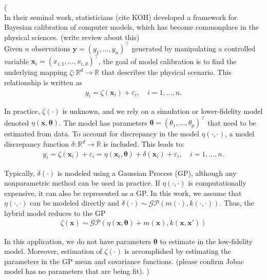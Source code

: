 \documentclass[journal=jacsat,manuscript=article]{achemso}
\newcommand{\kjnote}[1]{{\color{blue} (#1)}}
\newcommand{\kjtodo}[1]{{\color{red} (#1)}}
\newcommand{\alltodo}[1]{{\color{cyan} (#1)}}
\newcommand{\xvec}{\ensuremath{\mathbf{x}}}
\begin{document}
\kjnote{\\
In their seminal work, statisticians \kjtodo{cite KOH} developed a framework for Bayesian calibration of computer models, which has become commonplace in the physical sciences. \kjtodo{write review about this}\\

Given $n$ observations $\mathbf{y}=(y_1,\dots,y_n)^\intercal$ generated by manipulating a controlled variable $\xvec_i = (x_{i,1},\dots,x_{i,d})^\intercal$, the goal of model calibration is to find the underlying mapping $\zeta: \mathbb{R}^d \rightarrow \mathbb{R}$ that describes the physical scenario. This relationship is written as
\begin{gather}
    y_i = \zeta(\mathbf{x}_i) + \varepsilon_i, \quad i = 1,\dots,n. \label{eq: trueprocess}
\end{gather}

In practice, $\zeta(\cdot)$ is unknown, and we rely on a simulation or lower-fidelity model denoted $\eta(\mathbf{x}, \boldsymbol{\theta})$. The model has parameters $\boldsymbol{\theta}=(\theta_1,\dots,\theta_p)^\intercal$ that need to be estimated from data. To account for discrepancy in the model $\eta(\cdot,\cdot)$, a model discrepancy function $\delta: \mathbb{R}^d \rightarrow \mathbb{R}$ is included. This leads to:
\begin{gather}
     y_i = \zeta(\mathbf{x}_i) + \varepsilon_i = \eta(\mathbf{x}_i,\boldsymbol{\theta}) + \delta(\mathbf{x}_i) + \varepsilon_i, \quad i = 1,\dots,n.
\end{gather}

Typically, $\delta(\cdot)$ is modeled using a Gaussian Process (GP), although any nonparametric method can be used in practice. If $\eta(\cdot,\cdot)$ is computationally expensive, it can also be represented as a GP. In this work, we assume that $\eta(\cdot,\cdot)$ can be modeled directly and $\delta(\cdot)\sim \mathcal{GP}(m(\cdot),k(\cdot,\cdot))$. Thus, the hybrid model reduces to the GP
\begin{gather}
    \zeta(\mathbf{x}) \sim \mathcal{GP}(\eta(\mathbf{x},\boldsymbol{\theta}) + m(\mathbf{x}), k(\mathbf{x}, \mathbf{x}'))
\end{gather}

In this application, we do not have parameters $\boldsymbol{\theta}$ to estimate in the low-fidelity model. Moreover, estimation of $\zeta(\cdot)$ is accomplished by estimating the parameters in the GP mean and covariance functions.
\alltodo{please confirm Jobac model has no parameters that are being fit}.
}
\end{document}
